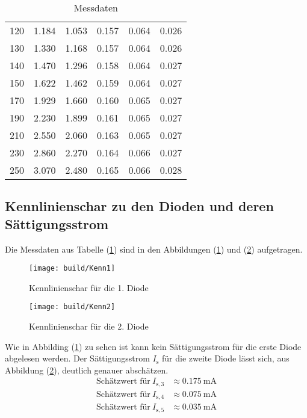 \begin{table}
\begin{tabular}{c||c|c|c|c|c}
      120	& 1.184 & 1.053 & 0.157	& 0.064	& 0.026 \\
      130	& 1.330 & 1.168 & 0.157	& 0.064	& 0.026 \\
      140	& 1.470 & 1.296 & 0.158	& 0.064	& 0.027 \\
      150	& 1.622 & 1.462 & 0.159	& 0.064	& 0.027 \\
      170	& 1.929 & 1.660 & 0.160	& 0.065	& 0.027 \\
      190	& 2.230 & 1.899 & 0.161	& 0.065	& 0.027 \\
      210	& 2.550 & 2.060 & 0.163	& 0.065	& 0.027 \\
      230	& 2.860 & 2.270 & 0.164	& 0.066	& 0.027 \\
      250	& 3.070 & 2.480 & 0.165	& 0.066	& 0.028 \\
      \bottomrule
    \end{tabular}
    \caption{Messdaten }
    \label{tab:Messdaten1}
  \end{table}

\subsection{Kennlinienschar zu den Dioden und deren Sättigungsstrom}
Die Messdaten aus Tabelle (\ref{tab:Messdaten1}) sind in den Abbildungen (\ref{fig:Kenn1}) und (\ref{fig:Kenn2}) aufgetragen.

\begin{figure} %
  \centering
  \texttt{[image: build/Kenn1]}
  \caption{Kennlinienschar für die 1. Diode}
  \label{fig:Kenn1}
\end{figure}

\begin{figure} %
  \centering
  \texttt{[image: build/Kenn2]}
  \caption{Kennlinienschar für die 2. Diode}
  \label{fig:Kenn2}
\end{figure}

Wie in Abbilding (\ref{fig:Kenn1}) zu sehen ist kann kein Sättigungsstrom für die erste Diode abgelesen werden. Der Sättigungsstrom $I_\text{s}$ für die zweite Diode lässt sich, aus Abbildung (\ref{fig:Kenn2}), deutlich genauer abschätzen.
\begin{align*}
  \text{Schätzwert für}\ I_{\text{s},3} & \approx 0.175 \ \text{mA} \\
  \text{Schätzwert für}\ I_{\text{s},4} & \approx 0.075 \ \text{mA} \\
  \text{Schätzwert für}\ I_{\text{s},5} & \approx 0.035 \ \text{mA}
\end{align*}

